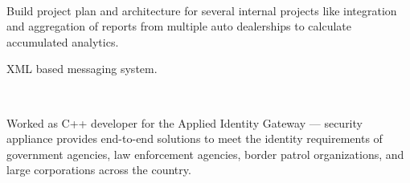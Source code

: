 \documentclass[]{hieudo-build}
\begin{document}
\begin{minipage}[t]{0.65\textwidth}
 \\
\begin{tightemize}
\item Build project plan and architecture for several internal projects like integration and aggregation of reports from multiple auto dealerships to calculate accumulated analytics. 
\item XML based messaging system.
\end{tightemize}
\sectionsep{}

 \\
\begin{tightemize}
\item Worked as C++ developer for the Applied Identity Gateway --- security appliance provides end-to-end solutions to meet the identity requirements of government agencies, law enforcement agencies, border patrol organizations, and large corporations across the country.
\end{tightemize}
\sectionsep{}




\end{minipage}
\end{document}
